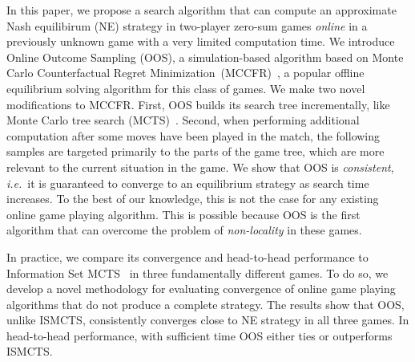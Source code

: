 \documentclass{aamas2015}
\newcommand{\ie}{{\it i.e.}~}
\begin{document}
In this paper, we propose a search algorithm that can compute an approximate Nash equilibirum (NE) strategy in two-player zero-sum games {\it online} in a previously unknown game with a very limited computation time. 
We introduce Online Outcome Sampling (OOS), a simulation-based algorithm based on Monte Carlo Counterfactual Regret Minimization~(MCCFR)~\cite{Lanctot09Sampling}, a popular offline equilibrium solving algorithm for this class of games. 
We make two novel modifications to MCCFR. First, OOS builds its search tree incrementally, like Monte Carlo tree search 
(MCTS)~\cite{Coulom06Efficient,UCT,mctssurvey}. Second, when performing additional computation after some moves have been played in the match, the following samples are targeted primarily to the parts of the game tree, which are more relevant to the current situation in the game.
We show that OOS is {\it consistent}, \ie it is guaranteed to converge to an equilibrium strategy as search time increases. To the best of our knowledge, this is not the case for any existing online game playing algorithm. This is possible because OOS is the first algorithm that can overcome the problem of \emph{non-locality} in these games.

In practice, we compare its convergence and head-to-head performance to Information Set 
MCTS~\cite{Cowling12ISMCTS,Whitehouse13Integrating,Lisy14selection} in three fundamentally different games. 
To do so, we develop a novel methodology for evaluating convergence of online game playing algorithms that do not produce a complete strategy. 
The results show that OOS, unlike ISMCTS, consistently converges close to NE strategy in all three games. In head-to-head performance, with sufficient time OOS either ties or outperforms ISMCTS. 

\end{document}

